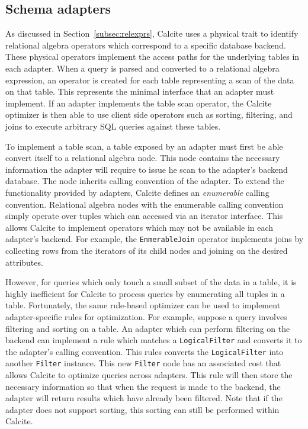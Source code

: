 \subsection{Schema adapters}
\label{subsec:adapters}

As discussed in Section~\ref{subsec:relexprs}, Calcite uses a physical trait to identify relational algebra operators which correspond to a specific database backend.
These physical operators implement the access paths for the underlying tables in each adapter.
When a query is parsed and converted to a relational algebra expression, an operator is created for each table representing a scan of the data on that table.
This represents the minimal interface that an adapter must implement.
If an adapter implements the table scan operator, the Calcite optimizer is then able to use client side operators such as sorting, filtering, and joins to execute arbitrary SQL queries against these tables.

To implement a table scan, a table exposed by an adapter must first be able convert itself to a relational algebra node.
This node contains the necessary information the adapter will require to issue he scan to the adapter's backend database.
The node inherits calling convention of the adapter.
To extend the functionality provided by adapters, Calcite defines an \emph{enumerable} calling convention.
Relational algebra nodes with the enumerable calling convention simply operate over tuples which can accessed via an iterator interface.
This allows Calcite to implement operators which may not be available in each adapter's backend.
For example, the \texttt{EnmerableJoin} operator implements joins by collecting rows from the iterators of its child nodes and joining on the desired attributes.

However, for queries which only touch a small subset of the data in a table, it is highly inefficient for Calcite to process queries by enumerating all tuples in a table.
Fortunately, the same rule-based optimizer can be used to implement adapter-specific rules for optimization.
For example, suppose a query involves filtering and sorting on a table.
An adapter which can perform filtering on the backend can implement a rule which matches a \texttt{LogicalFilter} and converts it to the adapter's calling convention.
This rules converts the \texttt{LogicalFilter} into another \texttt{Filter} instance.
This new \texttt{Filter} node has an associated cost that allows Calcite to optimize queries across adapters.
This rule will then store the necessary information so that when the request is made to the backend, the adapter will return results which have already been filtered.
Note that if the adapter does not support sorting, this sorting can still be performed within Calcite.

